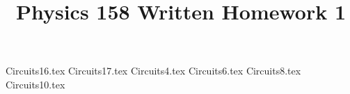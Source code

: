 \documentclass[11pt, fleqn]{article}
\title{Physics 158 Written Homework 1}
\author{}
\date{}
\begin{document}
\allowdisplaybreaks

\maketitle

{Circuits16.tex}
{Circuits17.tex}
{Circuits4.tex}
{Circuits6.tex}
{Circuits8.tex}
{Circuits10.tex}
\end{document}

